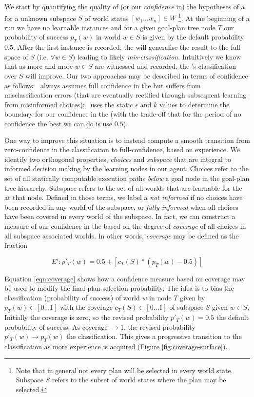 We start by quantifying the quality of (or our \textit{confidence} in)
the hypotheses of a \dt for a unknown subspace $S$ of world states
$[w_1 \ldots w_n] \in W$ \footnote{Note that in general not every plan
  will be selected in every world state. Subspace $S$ refers to the
  subset of world states where the plan may be selected.}. At the
beginning of a run we have no learnable instances and for a given
goal-plan tree node $T$ our probability of success $p_T(w)$ in world
$w \in S$ is given by the default probability $0.5$. After the first
instance is recorded, the \dt will generalise the result to the full
space of $S$ (i.e. $\forall w \in S$) leading to likely
\textit{mis-classification}. Intuitively we know that as more and more
$w \in S$ are witnessed and recorded, the \dt's classification over
$S$ will improve. Our two approaches may be described in terms of
confidence as follows: \CL\ always assumes full confidence in the \dt
but suffers from misclassification errors (that are eventually
rectified through subsequent learning from misinformed choices); \BUL\
uses the static $\epsilon$ and $k$ values to determine the boundary
for our confidence in the \dt (with the trade-off that for the period
of no confidence the best we can do is use $0.5$). 

One way to improve this situation is to instead compute a smooth transition from zero-confidence in the \dt classification to full-confidence, based on experience. We identify two orthogonal properties, \textit{choices} and \textit{subspace} that are integral to informed decision making by the learning nodes in our agent. Choices refer to the set of all statically computable execution paths \textit{below} a goal node in the goal-plan tree hierarchy. Subspace refers to the set of all worlds that are learnable for the \dt at that node. Defined in those terms, we label a \dt \textit{not informed} if no choices have been recorded in any world of the subspace, or \textit{fully informed} when all choices have been covered in every world of the subspace. In fact, we can construct a measure of our confidence in the \dt based on the degree of \textit{coverage} of all choices in all subspace associated worlds. In other words, \textit{coverage} may be defined as the fraction 

\begin{equation}
\label{eqn:coverage}   
E': p'_T(w)= 0.5 + \left[  c_T(S) *  \left( p_T(w) - 0.5 \right)  \right]
\end{equation}

Equation \ref{eqn:coverage} shows how a confidence measure based on coverage may be used to modify the final plan selection probability. The idea is to bias the \dt classification (probability of success) of world $w$ in node $T$ given by $p_T(w) \in [0 \ldots 1]$ with the coverage $c_T(S) \in [0 \ldots 1]$ of subspace $S$ given $w \in S$. Initially the coverage is zero, so the revised probability $p'_T(w) = 0.5$ the default probability of success. As coverage $\rightarrow 1$, the revised probability $p'_T(w) \rightarrow p_T(w)$ the \dt classification. This gives a progressive transition to the \dt classification as more experience is acquired (Figure \ref{fig:coverage-surface}).

